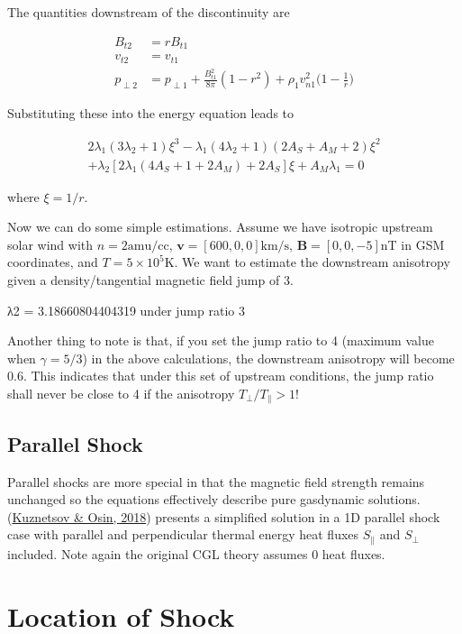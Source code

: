 \documentclass[
  notoc %
]{tufte-book}
\begin{document}
The quantities downstream of the discontinuity are

\[
\begin{aligned}
B_{t2} &= r B_{t1} \\
v_{t2} &= v_{t1} \\
p_{\perp 2} &= p_{\perp 1} + \frac{B_{t1}^2}{8\pi}(1-r^2) + \rho_1 v_{n1}^2\big( 1 - \frac{1}{r} \big)
\end{aligned}
\]

Substituting these into the energy equation leads to

\[
\begin{aligned}
2 \lambda_1(3\lambda_2 +1)\xi^3 − \lambda_1(4\lambda_2 +1)(2A_S + A_M +2)\xi^2 \\
+ \lambda_2[2\lambda_1(4A_S + 1 + 2A_M ) + 2A_S ]\xi + A_M \lambda_1 = 0
\end{aligned}
\]

where \(\xi = 1/r\).

Now we can do some simple estimations. Assume we have isotropic upstream
solar wind with \(n = 2 \textrm{amu/cc}\),
\(\mathbf{v} = [600, 0, 0] \textrm{km/s}\),
\(\mathbf{B} = [0, 0, -5] \textrm{nT}\) in GSM coordinates, and
\(T = 5\times 10^5 \textrm{K}\). We want to estimate the downstream
anisotropy given a density/tangential magnetic field jump of 3.

λ2 = 3.18660804404319 under jump ratio 3

Another thing to note is that, if you set the jump ratio to 4 (maximum
value when \(\gamma = 5/3\)) in the above calculations, the downstream
anisotropy will become 0.6. This indicates that under this set of
upstream conditions, the jump ratio shall never be close to 4 if the
anisotropy \(T_\perp/T_\parallel > 1\)!

\hypertarget{parallel-shock}{%
\subsection{Parallel Shock}\label{parallel-shock}}

Parallel shocks are more special in that the magnetic field strength
remains unchanged so the equations effectively describe pure gasdynamic
solutions. (\protect\hyperlink{ref-kuznetsov2018parallel}{Kuznetsov \&
Osin, 2018}) presents a simplified solution in a 1D parallel shock case
with parallel and perpendicular thermal energy heat fluxes
\(S_\parallel\) and \(S_\perp\) included. Note again the original CGL
theory assumes 0 heat fluxes.

\hypertarget{location-of-shock}{%
\section{Location of Shock}\label{location-of-shock}}
\end{document}

